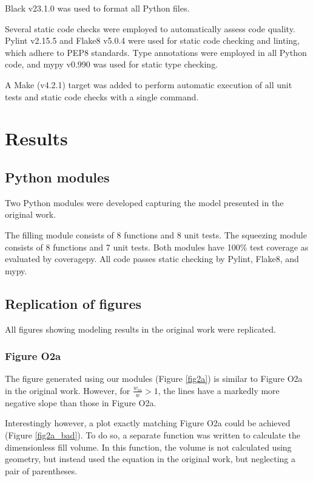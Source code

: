 Black v23.1.0\supercite{langa_black_2018} was used to format all Python files.

Several static code checks were employed to automatically assess code quality.
Pylint v2.15.5\supercite{thenault_pylint_2001} and
Flake8 v5.0.4\supercite{ziade_flake8_2011} were used for static code checking
and linting, which adhere to PEP8\supercite{van_rossum_pep_2001} standards. Type annotations were employed
in all Python code, and mypy v0.990\supercite{lehtosalo_mypy_2012} was used for
static type checking.

A Make (v4.2.1\supercite{feldman_gnu_1988}) target was added to perform automatic execution of all unit tests and static
code checks with a single command.

\section{Results}

\subsection{Python modules}

Two Python modules were developed capturing the model presented in the original work.

The filling module consists of 8 functions and 8 unit tests. The squeezing module consists
of 8 functions and 7 unit tests. Both modules have 100\% test coverage as evaluated by
coveragepy. All code passes static checking by Pylint, Flake8, and mypy.

\subsection{Replication of figures}

All figures showing modeling results in the original work were replicated. 

\subsubsection{Figure O2a}

The figure generated using our modules (Figure \ref{fig2a}) is similar to
Figure O2a in the original work. However, for $\frac{w_{in}}{w}>1$, the
lines have a markedly more negative slope than those in Figure O2a.

Interestingly however, a plot exactly matching Figure O2a could be achieved
(Figure \ref{fig2a_bad}). To do so,
a separate function was written to calculate the dimensionless fill volume. In this function,
the volume is not calculated using geometry, but instead used the equation in the original work,
but neglecting a pair of parentheses.

